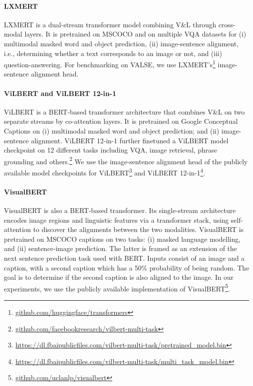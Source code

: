 \documentclass[11pt]{article}
\newcommand{\dataset}{VALSE}
\begin{document}
\paragraph{LXMERT}
LXMERT \cite{tan-bansal-2019-lxmert} is a dual-stream transformer model combining V\&L through cross-modal layers. It is pretrained on MSCOCO \cite{Lin-etal:2014:mscoco} and on multiple VQA datasets for (i) multimodal masked word and object prediction, (ii) image-sentence alignment, i.e., determining whether a text corresponds to an image or not, and (iii) question-answering. For benchmarking on \dataset{}, we use LXMERT's\footnote{\url{github.com/huggingface/transformers}} 
image-sentence alignment head.

\paragraph{ViLBERT and ViLBERT 12-in-1} ViLBERT \citep{lu2019vilbert} is a BERT-based transformer architecture that combines V\&L on two separate streams by co-attention layers. It is pretrained on Google Conceptual Captions \citep{sharma2018conceptual} on (i) multimodal masked word and object prediction; and (ii) image-sentence alignment.
ViLBERT 12-in-1 \citep{lu2020vilbert12in1} further finetuned a ViLBERT model checkpoint on 12 different tasks including VQA, image retrieval, phrase grounding and others.\footnote{\url{github.com/facebookresearch/vilbert-multi-task}}
We use the image-sentence alignment head of the publicly available model checkpoints for ViLBERT\footnote{\url{https://dl.fbaipublicfiles.com/vilbert-multi-task/pretrained_model.bin}} and ViLBERT 12-in-1\footnote{\url{https://dl.fbaipublicfiles.com/vilbert-multi-task/multi_task_model.bin}}.

\paragraph{VisualBERT} VisualBERT \cite{li2019visualbert} is also a BERT-based transformer. Its single-stream architecture encodes image regions and linguistic features via a transformer stack, using self-attention to discover the alignments between the two modalities. VisualBERT is pretrained on MSCOCO captions \cite{Chen2015} on two tasks: (i) masked language modelling, and (ii) sentence-image prediction. The latter is framed as an extension of the next sentence prediction task used with BERT. Inputs consist of an image and a caption, with a second caption which has a 50\% probability of being random. The goal is to determine if the second caption is also aligned to the image.
In our experiments, we use the publicly available implementation of VisualBERT\footnote{\url{github.com/uclanlp/visualbert}}.
\end{document}
